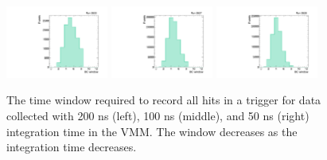 \begin{figure}[!htpb]
  \begin{center}
    \includegraphics[width=0.3\textwidth]{figures/gbtanalysis3530/artwin_lin.pdf}
    \includegraphics[width=0.3\textwidth]{figures/gbtanalysis3527/artwin_lin.pdf}
    \includegraphics[width=0.3\textwidth]{figures/gbtanalysis3528/artwin_lin.pdf}
  \end{center}
  \vspace{-10pt}
  \caption{The time window required to record all hits in a trigger for data collected with 200 ns (left), 100 ns (middle), and 50 ns (right) integration time in the VMM. The window decreases as the integration time decreases.}
  \label{fig:integ_window}
\end{figure}

